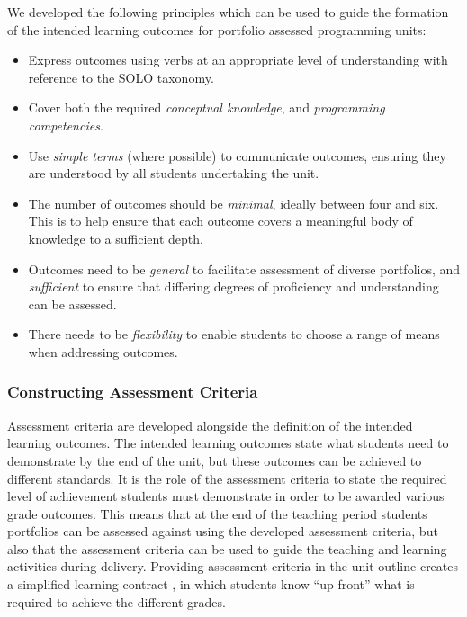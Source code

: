 \clearpage
We developed the following principles which can be used to guide the formation of the intended learning outcomes for portfolio assessed programming units:
\begin{itemize}[noitemsep,nolistsep]
  \item Express outcomes using verbs at an appropriate level of understanding with reference to the SOLO taxonomy.
  \item Cover both the required \emph{conceptual knowledge}, and \emph{programming competencies}.
  \item Use \emph{simple terms} (where possible) to communicate outcomes, ensuring they are understood by all students undertaking the unit.
  \item The number of outcomes should be \emph{minimal}, ideally between four and six. This is to help ensure that each outcome covers a meaningful body of knowledge to a sufficient depth.
  \item Outcomes need to be \emph{general} to facilitate assessment of diverse portfolios, and \emph{sufficient} to ensure that differing degrees of proficiency and understanding can be assessed.
  \item There needs to be \emph{flexibility} to enable students to choose a range of means when addressing outcomes.
\end{itemize}

\subsubsection{Constructing Assessment Criteria} %
\label{sub:constructing_assessment_criteria}

Assessment criteria are developed alongside the definition of the intended learning outcomes. The intended learning outcomes state what students need to demonstrate by the end of the unit, but these outcomes can be achieved to different standards. It is the role of the assessment criteria to state the required level of achievement students must demonstrate in order to be awarded various grade outcomes. This means that at the end of the teaching period students portfolios can be assessed against using the developed assessment criteria, but also that the assessment criteria can be used to guide the teaching and learning activities during delivery. Providing assessment criteria in the unit outline creates a simplified learning contract \cite{Stephenson:1993}, in which students know ``up front'' what is required to achieve the different grades. 

